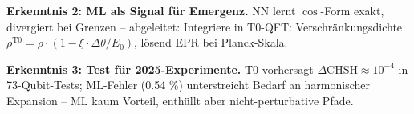 	\begin{important}
		\textbf{Erkenntnis 2: ML als Signal für Emergenz.} NN lernt $\cos$-Form exakt, divergiert bei Grenzen – abgeleitet: Integriere in T0-QFT: Verschränkungsdichte $\rho^{\mathrm{T0}} = \rho \cdot (1 - \xi \cdot \Delta \theta / E_0)$, lösend EPR bei Planck-Skala.
	\end{important}
	
	\begin{warning}
		\textbf{Erkenntnis 3: Test für 2025-Experimente.} T0 vorhersagt $\Delta \mathrm{CHSH} \approx 10^{-4}$ in 73-Qubit-Tests\cite{sciencedaily2025}; ML-Fehler (0.54 \%) unterstreicht Bedarf an harmonischer Expansion – ML kaum Vorteil, enthüllt aber nicht-perturbative Pfade.
	\end{warning}
	

